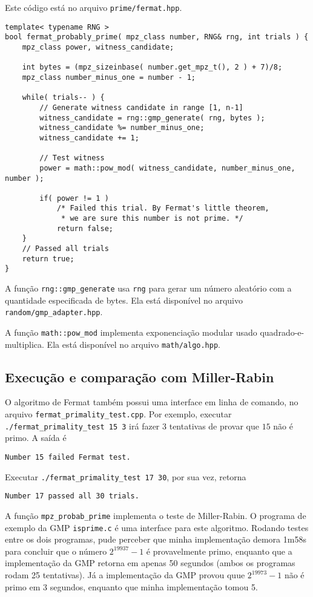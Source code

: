 \documentclass{article}
\begin{document}
Este código está no arquivo \verb"prime/fermat.hpp".
\begin{verbatim}
template< typename RNG >
bool fermat_probably_prime( mpz_class number, RNG& rng, int trials ) {
    mpz_class power, witness_candidate;

    int bytes = (mpz_sizeinbase( number.get_mpz_t(), 2 ) + 7)/8;
    mpz_class number_minus_one = number - 1;

    while( trials-- ) {
        // Generate witness candidate in range [1, n-1]
        witness_candidate = rng::gmp_generate( rng, bytes );
        witness_candidate %= number_minus_one;
        witness_candidate += 1;

        // Test witness
        power = math::pow_mod( witness_candidate, number_minus_one, number );

        if( power != 1 )
            /* Failed this trial. By Fermat's little theorem,
             * we are sure this number is not prime. */
            return false;
    }
    // Passed all trials
    return true;
}
\end{verbatim}

A função \verb"rng::gmp_generate" usa \verb"rng" para gerar um número aleatório
com a quantidade especificada de bytes.
Ela está disponível no arquivo \verb"random/gmp_adapter.hpp".

A função \verb"math::pow_mod" implementa exponenciação modular
usado quadrado-e-multiplica.
Ela está disponível no arquivo \verb"math/algo.hpp".

\subsection{Execução e comparação com Miller-Rabin}

O algoritmo de Fermat também possui uma interface em linha de comando,
no arquivo \verb"fermat_primality_test.cpp".
Por exemplo, executar \verb"./fermat_primality_test 15 3"
irá fazer $3$ tentativas de provar que $15$ não é primo.
A saída é
\begin{verbatim}
Number 15 failed Fermat test.
\end{verbatim}
Executar \verb"./fermat_primality_test 17 30", por sua vez, retorna
\begin{verbatim}
Number 17 passed all 30 trials.
\end{verbatim}

A função \verb"mpz_probab_prime" implementa o teste de Miller-Rabin.
O programa de exemplo da GMP \verb"isprime.c" é uma interface para este algoritmo.
Rodando testes entre os dois programas,
pude perceber que minha implementação demora 1m58s
para concluir que o número $2^{19937} - 1$ é provavelmente primo,
enquanto que a implementação da GMP retorna em apenas 50 segundos
(ambos os programas rodam 25 tentativas).
Já a implementação da GMP provou quue $2^{19973} - 1$ não é primo em 3 segundos,
enquanto que minha implementação tomou 5.
\end{document}
